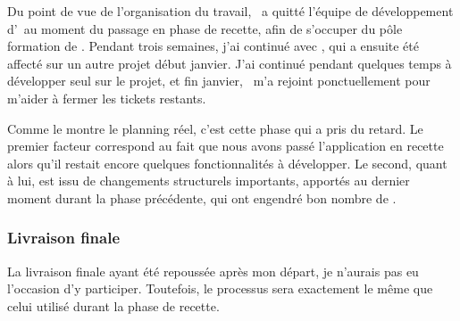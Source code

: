 Du point de vue de l'organisation du travail, \ahamon\ a quitté l'équipe de développement d'\aey\ au moment du passage en phase de recette, afin de s'occuper du pôle formation de \asl. Pendant trois semaines, j'ai continué avec \aweistroff, qui a ensuite été affecté sur un autre projet début janvier. J'ai continué pendant quelques temps à développer seul sur le projet, et fin janvier, \abachelet\ m'a rejoint ponctuellement pour m'aider à fermer les tickets restants.

Comme le montre le planning réel, c'est cette phase qui a pris du retard. Le premier facteur correspond au fait que nous avons passé l'application en recette alors qu'il restait encore quelques fonctionnalités à développer. Le second, quant à lui, est issu de changements structurels importants, apportés au dernier moment durant la phase précédente, qui ont engendré bon nombre de \abugs.


\subsubsection{Livraison finale}

La livraison finale ayant été repoussée après mon départ, je n'aurais pas eu l'occasion d'y participer. Toutefois, le processus sera exactement le même que celui utilisé durant la phase de recette.
